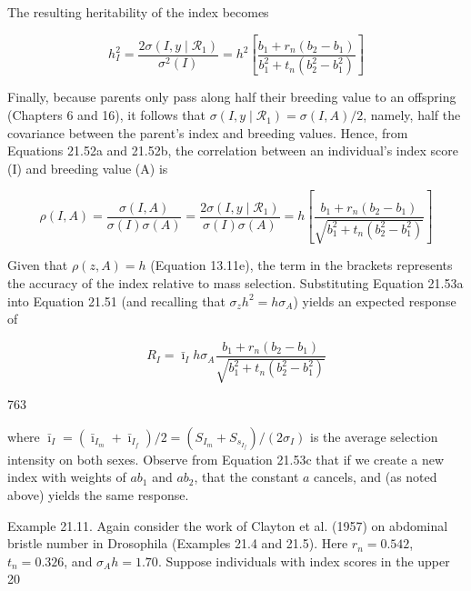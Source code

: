 \documentclass{article}
\begin{document}
The resulting heritability of the index becomes

\begin{equation}
h_{I}^{2}=\frac{2\sigma(I,y\mid\mathcal{R}_{1})}{\sigma^{2}(I)}=h^{2}\left[\frac{b_{1}+r_{n}(b_{2}-b_{1})}{b_{1}^{2}+t_{n}(b_{2}^{2}-b_{1}^{2})}\right]
\tag{21.53a}
\label{eq:21_53a}
\end{equation}

Finally, because parents only pass along half their breeding value to an offspring (Chapters 6 and 16), it follows that  $ \sigma(I, y \mid \mathcal{R}_1) = \sigma(I, A)/2 $, namely, half the covariance between the parent's index and breeding values. Hence, from Equations 21.52a and 21.52b, the correlation between an individual's index score (I) and breeding value (A) is

\begin{equation}
\rho(I,A)=\frac{\sigma(I,A)}{\sigma(I)\sigma(A)}=\frac{2\sigma(I,y\mid\mathcal{R}_{1})}{\sigma(I)\sigma(A)}=h\left[\frac{b_{1}+r_{n}(b_{2}-b_{1})}{\sqrt{b_{1}^{2}+t_{n}(b_{2}^{2}-b_{1}^{2})}}\right]
\tag{21.53b}
\label{eq:21_53b}
\end{equation}

Given that  $ \rho(z, A) = h $ (Equation 13.11e), the term in the brackets represents the accuracy of the index relative to mass selection. Substituting Equation 21.53a into Equation 21.51 (and recalling that  $ \sigma_z h^2 = h \sigma_A $) yields an expected response of

\begin{equation}
R_{I}=\bar{\imath}_{I}h\sigma_{A}\frac{b_{1}+r_{n}(b_{2}-b_{1})}{\sqrt{b_{1}^{2}+t_{n}(b_{2}^{2}-b_{1}^{2})}}
\tag{21.53c}
\label{eq:21_53c}
\end{equation}

763

where  $ \bar{\imath}_I = (\bar{\imath}_{I_m} + \bar{\imath}_{I_f})/2 = (S_{I_m} + S_{s_{I_f}})/(2\sigma_I) $ is the average selection intensity on both sexes. Observe from Equation 21.53c that if we create a new index with weights of  $ ab_1 $ and  $ ab_2 $, that the constant  $ a $ cancels, and (as noted above) yields the same response.

Example 21.11. Again consider the work of Clayton et al. (1957) on abdominal bristle number in Drosophila (Examples 21.4 and 21.5). Here  $ r_n = 0.542 $,  $ t_n = 0.326 $, and  $ \sigma_A h = 1.70 $. Suppose individuals with index scores in the upper 20%
\end{document}
